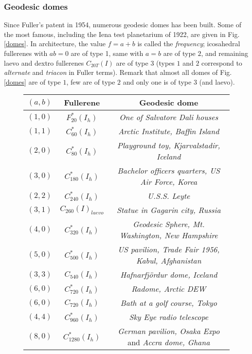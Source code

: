 \subsubsection{Geodesic domes}
Since {\sc Fuller}'s patent in 1954, numerous geodesic domes has been built. Some of the
most famous, including the Iena test planetarium of 1922, are given in Fig. \ref{domes}.
In architecture, the value $f=a+b$ is called the {\it frequency}; icosahedral fullerenes
with $ab=0$ are of type 1, same with $a=b$ are of type $2$, and remaining laevo and dextro
fullerenes $C_{20T}(I)$ are of type $3$ (types $1$ and $2$ correspond to 
{\it alternate}
and {\it triacon} in {\sc Fuller} terms). Remark that almost all domes of Fig. \ref{domes}
are of type $1$, few are of type $2$ and only one is of type $3$ (and laevo).
\begin{figure}[htbp]
\begin{center}
\begin{tabular}{|c|c|c|} \hline
$(a,b)$ & Fullerene & Geodesic dome \\ \hline \hline
$(1,0)$ & $F^*_{20}(I_h)$ & {\it One of Salvatore Dali houses} \\ \hline
$(1,1)$ & $C^*_{60}(I_h)$ & {\it Arctic Institute, Baffin Island} \\ \hline
$(2,0)$ & $C^*_{80}(I_h)$ & {\it Playground toy, Kjarvalstadir, Iceland} \\ \hline
$(3,0)$ & $C^*_{180}(I_h)$ & {\it Bachelor officers quarters, US Air Force, Korea} \\ \hline
$(2,2)$ & $C^*_{240}(I_h)$ & {\it U.S.S. Leyte } \\ \hline
$(3,1)$ & $C_{260}(I)_{laevo}$ & {\it Statue in Gagarin city, Russia} \\ \hline
$(4,0)$ & $C^*_{320}(I_h)$ & {\it Geodesic Sphere, Mt. Washington, New Hampshire} \\ \hline
$(5,0)$ & $C^*_{500}(I_h)$ & {\it US pavilion, Trade Fair 1956, Kabul, Afghanistan} \\ \hline
$(3,3)$ & $C_{540}(I_h)$ & {\it Hafnarfj\"ordur dome, Iceland} \\ \hline
$(6,0)$ & $C^*_{720}(I_h)$ & {\it Radome, Arctic DEW} \\ \hline
$(6,0)$ & $C_{720}(I_h)$ & {\it Bath at a golf course, Tokyo} \\ \hline
$(4,4)$ & $C^*_{960}(I_h)$ & {\it Sky Eye radio telescope} \\ \hline
$(8,0)$ & $C^*_{1280}(I_h)$ & {\it German pavilion, Osaka Expo} and {\it Accra dome, Ghana} \\ \hline

\end{tabular}
\end{center}
\end{figure}
